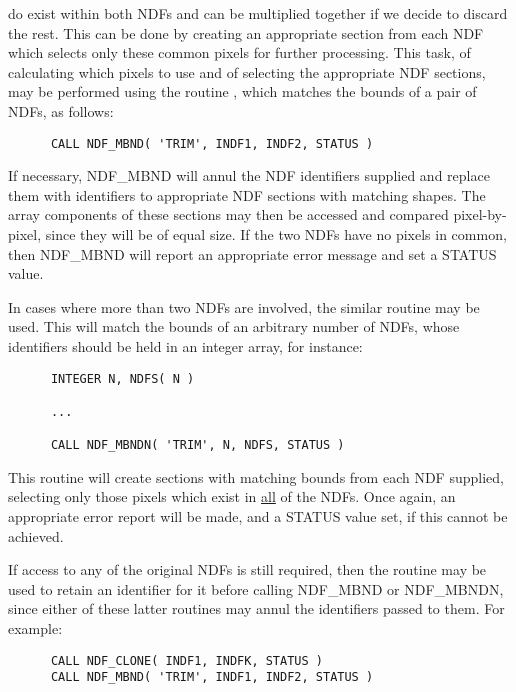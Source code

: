 do exist within both NDFs and can be multiplied together if we decide to 
discard the rest.
This can be done by creating an appropriate section from each NDF which 
selects only these common pixels for further processing.
This task, of calculating which pixels to use and of selecting the
appropriate NDF sections, may be performed using the routine ,
which matches the bounds of a pair of NDFs, as follows: 

\small
\begin{verbatim}
      CALL NDF_MBND( 'TRIM', INDF1, INDF2, STATUS )
\end{verbatim}
\normalsize

If necessary, NDF\_MBND will annul the NDF identifiers supplied and replace
them with identifiers to appropriate NDF sections with matching shapes. 
The array components of these sections may then be accessed and compared
pixel-by-pixel, since they will be of equal size. 
If the two NDFs have no pixels in common, then NDF\_MBND will report an
appropriate error message and set a STATUS value. 

In cases where more than two NDFs are involved, the similar routine 
 may be used.
This will match the bounds of an arbitrary number of NDFs, whose
identifiers should be held in an integer array, for instance:

\small
\begin{verbatim}
      INTEGER N, NDFS( N )

      ...

      CALL NDF_MBNDN( 'TRIM', N, NDFS, STATUS )
\end{verbatim}
\normalsize

This routine will create sections with matching bounds from each NDF
supplied, selecting only those pixels which exist in \underline{all} of the
NDFs. 
Once again, an appropriate error report will be made, and a STATUS value
set, if this cannot be achieved. 

If access to any of the original NDFs is still required, then the routine
 may be used to retain an identifier for it before calling
NDF\_MBND or NDF\_MBNDN, since either of these latter routines may annul the
identifiers passed to them. 
For example:

\small
\begin{verbatim}
      CALL NDF_CLONE( INDF1, INDFK, STATUS )
      CALL NDF_MBND( 'TRIM', INDF1, INDF2, STATUS )
\end{verbatim}
\normalsize

